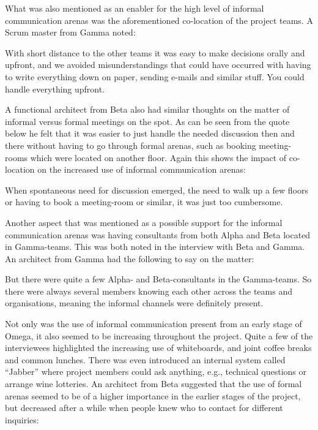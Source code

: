 What was also mentioned as an enabler for the high level of informal communication arenas was the aforementioned co-location of the project teams. A Scrum master from Gamma noted:

\begin{fancyquotes}
With short distance to the other teams it was easy to make decisions orally and upfront, and we avoided misunderstandings that could have occurred with having to write everything down on paper, sending e-mails and similar stuff. You could handle everything upfront.
\end{fancyquotes}

A functional architect from Beta also had similar thoughts on the matter of informal versus formal meetings on the spot. As can be seen from the quote below he felt that it was easier to just handle the needed discussion then and there without having to go through formal arenas, such as booking meeting-rooms which were located on another floor. Again this shows the impact of co-location on the increased use of informal communication arenas:

\begin{fancyquotes}
When spontaneous need for discussion emerged, the need to walk up a few floors or having to book a meeting-room or similar, it was just too cumbersome.
\end{fancyquotes}

Another aspect that was mentioned as a possible support for the informal communication arenas was having consultants from both Alpha and Beta located in Gamma-teams. This was both noted in the interview with Beta and Gamma. An architect from Gamma had the following to say on the matter:

\begin{fancyquotes}
But there were quite a few Alpha- and Beta-consultants in the Gamma-teams. So there were always several members knowing each other across the teams and organisations, meaning the informal channels were definitely present.
\end{fancyquotes}

Not only was the use of informal communication present from an early stage of Omega, it also seemed to be increasing throughout the project. Quite a few of the interviewees highlighted the increasing use of whiteboards, and joint coffee breaks and common lunches. There was even introduced an internal system called ``Jabber'' where project members could ask anything, e.g., technical questions or arrange wine lotteries. An architect from Beta suggested that the use of formal arenas seemed to be of a higher importance in the earlier stages of the project, but decreased after a while when people knew who to contact for different inquiries:

